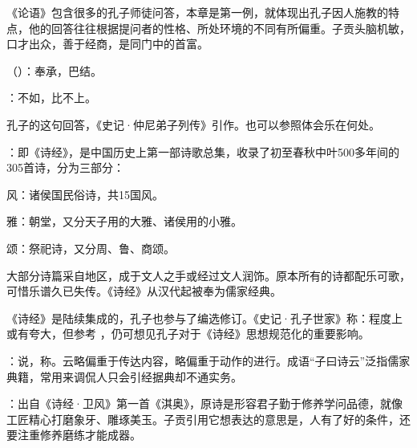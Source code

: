 {
《论语》包含很多的孔子师徒问答，本章是第一例，就体现出孔子因人施教的特点，他的回答往往根据提问者的性格、所处环境的不同有所偏重。子贡头脑机敏，口才出众，善于经商，是同门中的首富。
\begin{lyblobitemize}
\item {}（）：奉承，巴结。
\item {}：不如，比不上。

孔子的这句回答，《史记·仲尼弟子列传》引作。也可以参照体会乐在何处。

\item {}：即《诗经》，是中国历史上第一部诗歌总集，收录了初至春秋中叶500多年间的305首诗，分为三部分：
\begin{lyitemize}
\item 风：诸侯国民俗诗，共15国风。
\item 雅：朝堂，又分天子用的大雅、诸侯用的小雅。
\item 颂：祭祀诗，又分周、鲁、商颂。
\end{lyitemize}
大部分诗篇采自地区，成于文人之手或经过文人润饰。原本所有的诗都配乐可歌，可惜乐谱久已失传。《诗经》从汉代起被奉为儒家经典。

《诗经》是陆续集成的，孔子也参与了编选修订。《史记·孔子世家》称：程度上或有夸大，但参考 ，仍可想见孔子对于《诗经》思想规范化的重要影响。

\item {}：说，称。云略偏重于传达内容，略偏重于动作的进行。成语“子曰诗云”泛指儒家典籍，常用来调侃人只会引经据典却不通实务。
\item {}：出自《诗经·卫风》第一首《淇奥》，原诗是形容君子勤于修养学问品德，就像工匠精心打磨象牙、雕琢美玉。子贡引用它想表达的意思是，人有了好的条件，还要注重修养磨练才能成器。


\end{lyblobitemize}}
